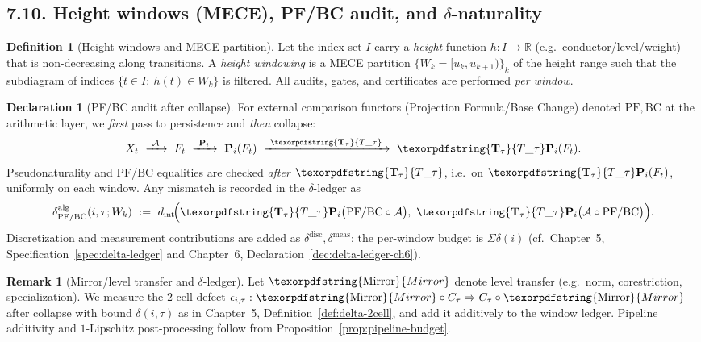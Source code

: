 \documentclass[11pt]{article}
\numberwithin{equation}{section}
\theoremstyle{plain}
\theoremstyle{definition}
\theoremstyle{remark}
\DeclareRobustCommand{\hyp}{\nobreakdash-}
\theoremstyle{plain}
\theoremstyle{definition}
\numberwithin{equation}{section}
\theoremstyle{definition}
\newtheorem{definition}[theorem]{Definition}
\newtheorem{remark}[theorem]{Remark}
\newtheorem{declaration}[theorem]{Declaration}
\DeclareRobustCommand{\Ttau}{\texorpdfstring{\ensuremath{\mathbf{T}_{\tau}}}{T\_\tau}}
\DeclareRobustCommand{\Mirror}{\texorpdfstring{\ensuremath{\operatorname{Mirror}}}{Mirror}}
\numberwithin{equation}{section}
\theoremstyle{plain}
\theoremstyle{definition}
\theoremstyle{remark}
\providecommand{\Tfun}[1]{\mathbf{T}_{#1}}
\providecommand{\Ttau}{\Tfun{\tau}}
\begin{document}

\subsection*{7.10. Height windows (MECE), PF/BC audit, and $\delta$-naturality}
\begin{definition}[Height windows and MECE partition]\label{def:height-windows}
Let the index set \(I\) carry a \emph{height} function \(h:I\to \mathbb{R}\) (e.g.\ conductor/level/weight) that is non\hyp decreasing along transitions. A \emph{height windowing} is a MECE partition \(\{W_k=[u_k,u_{k+1})\}_k\) of the height range such that the subdiagram of indices \(\{t\in I:\ h(t)\in W_k\}\) is filtered. All audits, gates, and certificates are performed \emph{per window}.
\end{definition}

\begin{declaration}[PF/BC audit after collapse]\label{dec:pf-bc-audit}
For external comparison functors (Projection Formula/Base Change) denoted \(\mathrm{PF},\mathrm{BC}\) at the arithmetic layer, we \emph{first} pass to persistence and \emph{then} collapse:
\[
X_t\ \xrightarrow{\ \mathcal{A}\ }\ F_t\ \xrightarrow{\ \mathbf{P}_i\ }\ \mathbf{P}_i(F_t)\ \xrightarrow{\ \Ttau\ }\ \Ttau\mathbf{P}_i(F_t).
\]
Pseudonaturality and PF/BC equalities are checked \emph{after} \(\Ttau\), i.e.\ on \(\Ttau\mathbf{P}_i(F_t)\), uniformly on each window. Any mismatch is recorded in the \(\delta\)\hyp ledger as
\[
\delta^{\mathrm{alg}}_{\mathrm{PF/BC}}(i,\tau;W_k)\ :=\ d_{\mathrm{int}}\!\Big(\Ttau \mathbf{P}_i\big(\mathrm{PF/BC}\circ \mathcal{A}\big),\ \Ttau \mathbf{P}_i\big(\mathcal{A}\circ \mathrm{PF/BC}\big)\Big).
\]
Discretization and measurement contributions are added as \(\delta^{\mathrm{disc}},\delta^{\mathrm{meas}}\); the per\hyp window budget is \(\Sigma\delta(i)\) (cf.\ Chapter~5, Specification~\ref{spec:delta-ledger} and Chapter~6, Declaration~\ref{dec:delta-ledger-ch6}).
\end{declaration}

\begin{remark}[Mirror/level transfer and $\delta$-ledger]
Let \(\Mirror\) denote level transfer (e.g.\ norm, corestriction, specialization). We measure the $2$-cell defect \(\epsilon_{i,\tau}:\Mirror\circ C_\tau\Rightarrow C_\tau\circ \Mirror\) after collapse with bound \(\delta(i,\tau)\) as in Chapter~5, Definition~\ref{def:delta-2cell}, and add it additively to the window ledger. Pipeline additivity and $1$-Lipschitz post\hyp processing follow from Proposition~\ref{prop:pipeline-budget}.
\end{remark}
\end{document}

